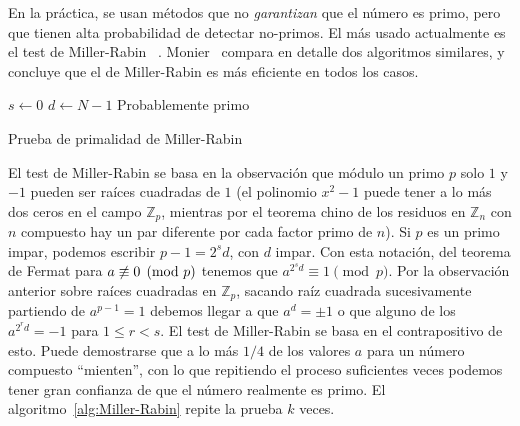   En la práctica,
  se usan métodos que no \emph{garantizan} que el número es primo,
  pero que tienen alta probabilidad de detectar no-primos.
  El más usado actualmente es el test de Miller-Rabin~%
    \cite{miller76:_Riemann_hypot_tests_primality,
	  rabin80:_probab_algor_test_primality}.%
  Monier~\cite{monier80:_evaluat_compar_two_effic_probab}
  compara en detalle dos algoritmos similares,
  y concluye que el de Miller-Rabin
  es más eficiente en todos los casos.

  \begin{algorithm}[htbp]
    \DontPrintSemicolon

    \KwFunction {} \;
    \BlankLine
    \(s \leftarrow 0\) \;
    \(d \leftarrow N - 1\) \;
    \Return Probablemente primo
    \caption{Prueba de primalidad de Miller-Rabin}
    \label{alg:Miller-Rabin}
  \end{algorithm}
  El test de Miller-Rabin
  se basa en la observación que módulo un primo \(p\)
  solo \(1\) y \(-1\) pueden ser raíces cuadradas de \(1\)
  (el polinomio \(x^2 - 1\) puede tener a lo más dos ceros
   en el campo \(\mathbb{Z}_p\),
   mientras por el teorema chino de los residuos
   en \(\mathbb{Z}_n\) con \(n\) compuesto
   hay un par diferente por cada factor primo de \(n\)).
  Si \(p\) es un primo impar,
  podemos escribir \(p - 1 = 2^s d\),
  con \(d\) impar.
  Con esta notación,
  del teorema de Fermat para \(a \centernot\equiv 0 \pmod{p}\)
  tenemos que \(a^{2^s d} \equiv 1 \pmod{p}\).
  Por la observación anterior
  sobre raíces cuadradas en \(\mathbb{Z}_p\),
  sacando raíz cuadrada sucesivamente partiendo de \(a^{p - 1} = 1\)
  debemos llegar a que \(a^d = \pm 1\)
  o que alguno de los \(a^{{2^r}d} = -1\) para \(1 \le r < s\).
  El test de Miller-Rabin se basa en el contrapositivo de esto.
  Puede demostrarse que a lo más \(1 / 4\) de los valores \(a\)
  para un número compuesto ``mienten'',
  con lo que repitiendo el proceso suficientes veces
  podemos tener gran confianza de que el número realmente es primo.
  El algoritmo~\ref{alg:Miller-Rabin} repite la prueba \(k\) veces.

